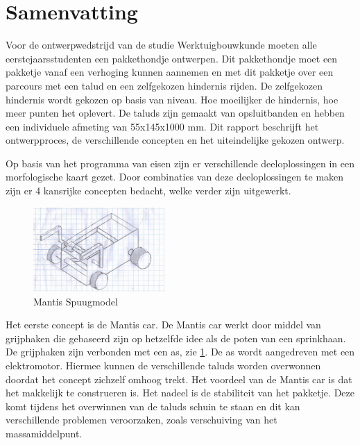 \chapter*{Samenvatting}
\label{cha:Samenvatting}

Voor de ontwerpwedstrijd van de studie Werktuigbouwkunde moeten alle eerstejaarsstudenten een pakkethondje ontwerpen. Dit pakkethondje moet een pakketje vanaf een verhoging kunnen aannemen en met dit pakketje over een parcours met een talud en een zelfgekozen hindernis rijden. De zelfgekozen hindernis wordt gekozen op basis van niveau. Hoe moeilijker de hindernis, hoe meer punten het oplevert. De taluds zijn gemaakt van opsluitbanden en hebben een individuele afmeting van 55x145x1000 mm. Dit rapport beschrijft het ontwerpproces, de verschillende concepten en het uiteindelijke gekozen ontwerp.

\vspace{\baselineskip}
Op basis van het programma van eisen zijn er verschillende deeloplossingen in een morfologische kaart gezet. Door combinaties van deze deeloplossingen te maken zijn er 4 kansrijke concepten bedacht, welke verder zijn uitgewerkt.

\vspace{\baselineskip}
\begin{figure}
    \includegraphics[width = 50mm]{04_idee_ontwikkeling/deeloplossing_mantis.JPG}
    \caption{Mantis Spuugmodel }
    \label{fig: deeloplossingmantis2.0_FBD}
\end{figure}

Het eerste concept is de Mantis car. De Mantis car werkt door middel van grijphaken die gebaseerd zijn op hetzelfde idee als de poten van een sprinkhaan. De grijphaken zijn verbonden met een as, zie \cref{fig: deeloplossingmantis2.0_FBD}. De as wordt aangedreven met een elektromotor. Hiermee kunnen de verschillende taluds worden overwonnen doordat het concept zichzelf omhoog trekt. Het voordeel van de Mantis car is dat het makkelijk te construeren is. Het nadeel is de stabiliteit van het pakketje. Deze komt tijdens het overwinnen van de taluds schuin te staan en dit kan verschillende problemen veroorzaken, zoals verschuiving van het massamiddelpunt.

